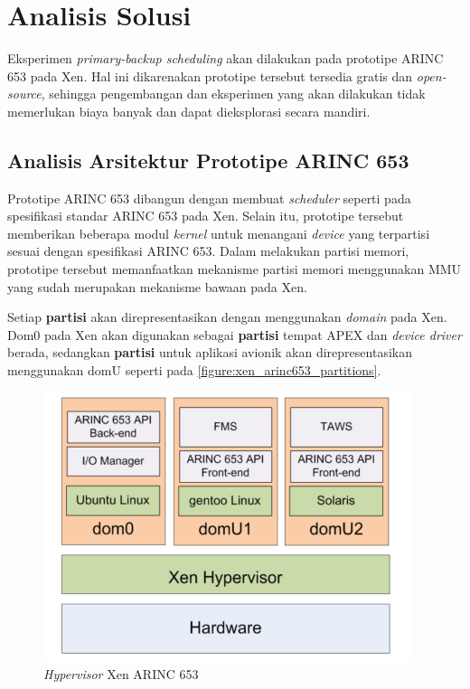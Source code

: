 \section{Analisis Solusi}

Eksperimen \textit{primary-backup scheduling} akan dilakukan pada prototipe ARINC 653 pada Xen.
Hal ini dikarenakan prototipe tersebut tersedia gratis dan \textit{open-source}, sehingga pengembangan dan eksperimen yang akan dilakukan tidak memerlukan biaya banyak dan dapat dieksplorasi secara mandiri.

\subsection{Analisis Arsitektur Prototipe ARINC 653}

Prototipe ARINC 653 dibangun dengan membuat \textit{scheduler} seperti pada spesifikasi standar ARINC 653 pada Xen.
Selain itu, prototipe tersebut memberikan beberapa modul \textit{kernel} untuk menangani \textit{device} yang terpartisi sesuai dengan spesifikasi ARINC 653.
Dalam melakukan partisi memori, prototipe tersebut memanfaatkan mekanisme partisi memori menggunakan MMU yang sudah merupakan mekanisme bawaan pada Xen.

Setiap \textbf{partisi} akan direpresentasikan dengan menggunakan \textit{domain} pada Xen.
Dom0 pada Xen akan digunakan sebagai \textbf{partisi} tempat APEX dan \textit{device driver} berada, sedangkan \textbf{partisi} untuk aplikasi avionik akan direpresentasikan menggunakan domU seperti pada \autoref{figure:xen_arinc653_partitions}.

\begin{figure}[htbp]
    \centering
    \includegraphics[scale=0.6]{resources/xen-arinc653-partitions.png}
    \caption{\textit{Hypervisor} Xen ARINC 653}
    \label{figure:xen_arinc653_partitions}
\end{figure}

